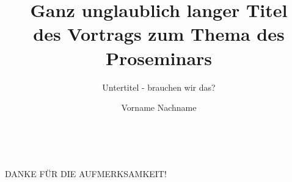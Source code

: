 \documentclass[18pt]{beamer}
\title[Kurzer Titel]{Ganz unglaublich langer Titel\\des Vortrags zum Thema des Proseminars}
\subtitle{Untertitel - brauchen wir das?}
\author{Vorname Nachname}
\institute{Proseminar Anthropomatik: Von der Theorie zur Anwendung}
\begin{document}

\begin{frame}
\titlepage
\end{frame}


\begin{frame}{~}
	\begin{center}
		\huge{DANKE FÜR DIE AUFMERKSAMKEIT!}
	\end{center}
\end{frame}
\end{document}
